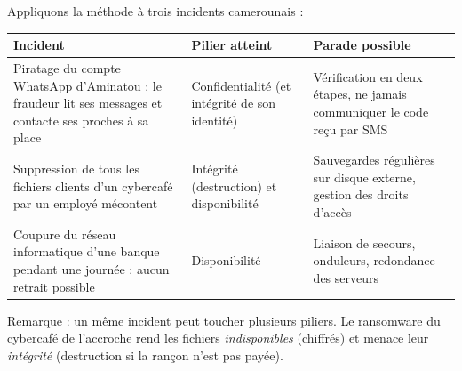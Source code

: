 \documentclass[11pt]{article}
\begin{document}
\begin{exemplebox}
Appliquons la méthode à trois incidents camerounais :
\begin{center}
\begin{tabularx}{\linewidth}{|X|l|X|}
\hline
\rowcolor{popblueL} \textbf{Incident} & \textbf{Pilier atteint} & \textbf{Parade possible} \\
\hline
Piratage du compte WhatsApp d'Aminatou : le fraudeur lit ses messages et contacte ses proches à sa place & Confidentialité (et intégrité de son identité) & Vérification en deux étapes, ne jamais communiquer le code reçu par SMS \\
\hline
Suppression de tous les fichiers clients d'un cybercafé par un employé mécontent & Intégrité (destruction) et disponibilité & Sauvegardes régulières sur disque externe, gestion des droits d'accès \\
\hline
Coupure du réseau informatique d'une banque pendant une journée : aucun retrait possible & Disponibilité & Liaison de secours, onduleurs, redondance des serveurs \\
\hline
\end{tabularx}
\end{center}
Remarque : un même incident peut toucher plusieurs piliers. Le ransomware du cybercafé de l'accroche rend les fichiers \emph{indisponibles} (chiffrés) et menace leur \emph{intégrité} (destruction si la rançon n'est pas payée).
\end{exemplebox}
\end{document}
